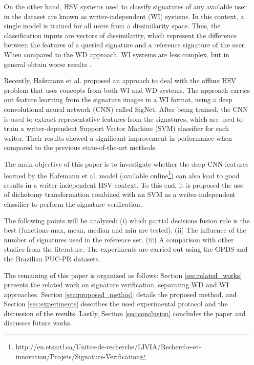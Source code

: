 \documentclass[conference]{IEEEtran}
\begin{document}
On the other hand, HSV systems used to classify signatures of any available user in the dataset are known as writer-independent (WI) systems. In this context, a single model is trained for all users from a dissimilarity space. Thus, the classification inputs are vectors of dissimilarity, which represent the difference between the features of a queried signature and a reference signature of the user. When compared to the WD approach, WI systems are less complex, but in general obtain worse results \cite{hafemann:17}.

Recently, Hafemann et al. \cite{hafemann:17} proposed an approach to deal with the offline HSV problem that uses concepts from both WI and WD systems. The approach carries out feature learning from the signature images in a WI format, using a deep convolutional neural network (CNN) called SigNet. After being trained, the CNN is used to extract representative features from the signatures, which are used to train a writer-dependent Support Vector Machine (SVM) classifier for each writer. Their results showed a significant improvement in performance when compared to the previous state-of-the-art methods.

The main objective of this paper is to investigate whether the deep CNN features learned by the Hafemann et al. model \cite{hafemann:17} (available online\footnote{http://en.etsmtl.ca/Unites-de-recherche/LIVIA/Recherche-et-innovation/Projets/Signature-Verification}) can also lead to good results in a writer-independent HSV context. To this end, it is proposed the use of dichotomy transformation \cite{rivard:13} combined with an SVM as a writer-independent classifier to perform the signature verification. 

The following points will be analyzed: (i) which partial decisions fusion rule is the best (functions max, mean, median and min are tested). (ii) The influence of the number of signatures used in the reference set. (iii) A comparison  with other studies from the literature. The experiments are carried out using the GPDS and the Brazilian PUC-PR datasets.

The remaining of this paper is organized as follows: Section \ref{sec:related_works} presents the related work on signature verification, separating WD and WI approaches. Section \ref{sec:proposed_method} details the proposed method, and Section \ref{sec:experiments} describes the used experimental protocol and the discussion of the results. Lastly, Section \ref{sec:conclusion} concludes the paper and discusses future works.
\end{document}
